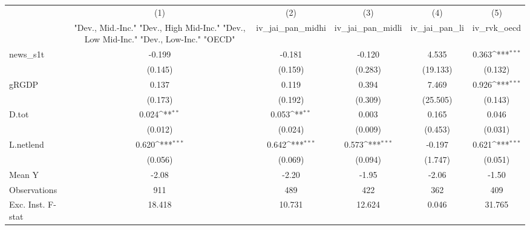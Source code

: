 {
\def\sym#1{\ifmmode^{#1}\else\(^{#1}\)\fi}
\begin{tabular}{l*{5}{c}}
\toprule
            &\multicolumn{1}{c}{(1)}&\multicolumn{1}{c}{(2)}&\multicolumn{1}{c}{(3)}&\multicolumn{1}{c}{(4)}&\multicolumn{1}{c}{(5)}\\
            &\multicolumn{1}{c}{ "Dev., Mid.-Inc." "Dev., High Mid-Inc." "Dev., Low Mid-Inc." "Dev., Low-Inc." "OECD" }&\multicolumn{1}{c}{iv\_jai\_pan\_midhi}&\multicolumn{1}{c}{iv\_jai\_pan\_midli}&\multicolumn{1}{c}{iv\_jai\_pan\_li}&\multicolumn{1}{c}{iv\_rvk\_oecd}\\
\midrule
news\_s1t    &      -0.199         &      -0.181         &      -0.120         &       4.535         &       0.363\sym{***}\\
            &     (0.145)         &     (0.159)         &     (0.283)         &    (19.133)         &     (0.132)         \\
\addlinespace
gRGDP       &       0.137         &       0.119         &       0.394         &       7.469         &       0.926\sym{***}\\
            &     (0.173)         &     (0.192)         &     (0.309)         &    (25.505)         &     (0.143)         \\
\addlinespace
D.tot       &       0.024\sym{**} &       0.053\sym{**} &       0.003         &       0.165         &       0.046         \\
            &     (0.012)         &     (0.024)         &     (0.009)         &     (0.453)         &     (0.031)         \\
\addlinespace
L.netlend   &       0.620\sym{***}&       0.642\sym{***}&       0.573\sym{***}&      -0.197         &       0.621\sym{***}\\
            &     (0.056)         &     (0.069)         &     (0.094)         &     (1.747)         &     (0.051)         \\
\midrule
Mean Y      &       -2.08         &       -2.20         &       -1.95         &       -2.06         &       -1.50         \\
Observations&         911         &         489         &         422         &         362         &         409         \\
Exc. Inst. F-stat&      18.418         &      10.731         &      12.624         &       0.046         &      31.765         \\
\bottomrule
\end{tabular}
}
